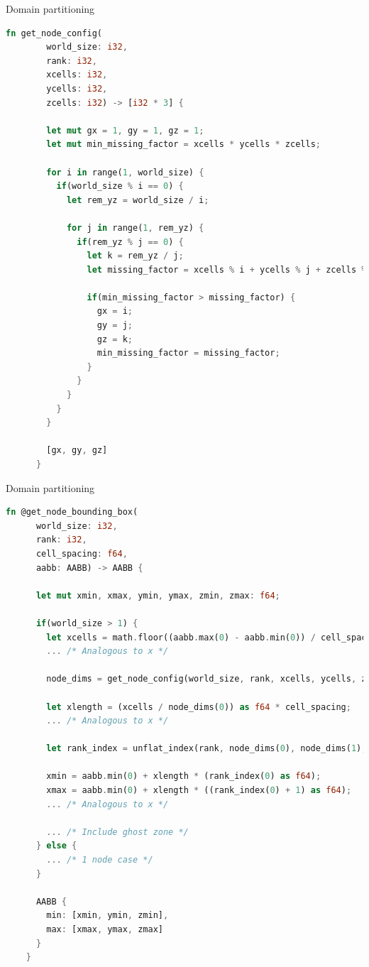 \documentclass[aspectratio=43,t]{beamer}
\begin{document}
  \begin{frame}[fragile]{Domain partitioning}
    \begin{lstlisting}[basicstyle=\tiny\ttfamily,language=Rust]
      fn get_node_config(
        world_size: i32,
        rank: i32,
        xcells: i32, 
        ycells: i32, 
        zcells: i32) -> [i32 * 3] { 

        let mut gx = 1, gy = 1, gz = 1; 
        let mut min_missing_factor = xcells * ycells * zcells;

        for i in range(1, world_size) {
          if(world_size % i == 0) { 
            let rem_yz = world_size / i; 

            for j in range(1, rem_yz) {
              if(rem_yz % j == 0) { 
                let k = rem_yz / j; 
                let missing_factor = xcells % i + ycells % j + zcells % k; 

                if(min_missing_factor > missing_factor) {
                  gx = i; 
                  gy = j; 
                  gz = k; 
                  min_missing_factor = missing_factor;
                }
              }
            }    
          }    
        }

        [gx, gy, gz]
      }
    \end{lstlisting}
  \end{frame}

  \begin{frame}[fragile]{Domain partitioning}
    \begin{lstlisting}[basicstyle=\tiny\ttfamily,language=Rust]
    fn @get_node_bounding_box(
      world_size: i32,
      rank: i32,
      cell_spacing: f64,
      aabb: AABB) -> AABB {

      let mut xmin, xmax, ymin, ymax, zmin, zmax: f64;

      if(world_size > 1) {
        let xcells = math.floor((aabb.max(0) - aabb.min(0)) / cell_spacing) as i32;
        ... /* Analogous to x */

        node_dims = get_node_config(world_size, rank, xcells, ycells, zcells);

        let xlength = (xcells / node_dims(0)) as f64 * cell_spacing;
        ... /* Analogous to x */

        let rank_index = unflat_index(rank, node_dims(0), node_dims(1), node_dims(2));

        xmin = aabb.min(0) + xlength * (rank_index(0) as f64);
        xmax = aabb.min(0) + xlength * ((rank_index(0) + 1) as f64);
        ... /* Analogous to x */

        ... /* Include ghost zone */
      } else {
        ... /* 1 node case */
      }

      AABB {
        min: [xmin, ymin, zmin],
        max: [xmax, ymax, zmax]
      }
    }
    \end{lstlisting}
  \end{frame}
\end{document}
